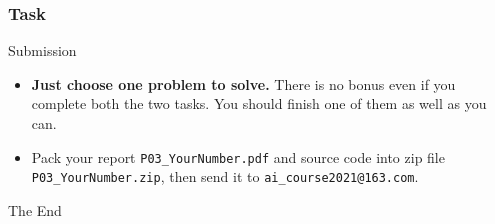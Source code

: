 \documentclass{beamer}
\begin{document}
\begin{frame} \frametitle{Task}
  \begin{block}{Submission}
    \begin{itemize}
      \item \textbf{Just choose one problem to solve.} There is no bonus even if you complete both the two tasks. You should finish one of them as well as you can.
\item Pack your report \texttt{P03\_YourNumber.pdf} and source code into zip file \texttt{P03\_YourNumber.zip}, then send it to \texttt{ai\_course2021@163.com}.

    \end{itemize}

    
  \end{block}
\end{frame}




\begin{frame}
  \Huge{\centerline{The End}}
\end{frame}

\end{document}
